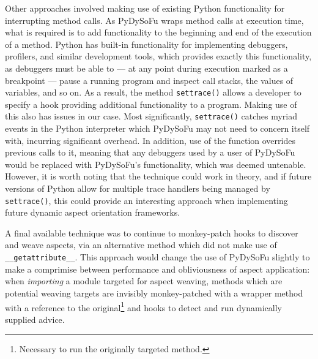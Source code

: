 Other approaches involved making use of existing Python functionality for
interrupting method calls. As PyDySoFu wraps method calls at execution time,
what is required is to add functionality to the beginning and end of the
execution of a method. Python has built-in functionality for implementing
debuggers, profilers, and similar development tools, which provides exactly this
functionality, as debuggers must be able to --- at any point during execution
marked as a breakpoint --- pause a running program and inspect call stacks, the
values of variables, and so on. As a result, the method \lstinline{settrace()}
allows a developer to specify a hook providing additional functionality to a
program. Making use of this also has issues in our case. Most significantly,
\lstinline{settrace()} catches myriad events in the Python interpreter which
PyDySoFu may not need to concern itself with, incurring significant overhead. In
addition, use of the function overrides previous calls to it, meaning that any
debuggers used by a user of PyDySoFu would be replaced with PyDySoFu's
functionality, which was deemed untenable. However, it is worth noting that the
technique could work in theory, and if future versions of Python allow for
multiple trace handlers being managed by \lstinline{settrace()}, this could
provide an interesting approach when implementing future dynamic aspect
orientation frameworks.


A final available technique was to continue to monkey-patch hooks to discover
and weave aspects, via an alternative method which did not make use of
\lstinline{__getattribute__}. This approach would change the use of PyDySoFu
slightly to make a comprimise between performance and obliviousness of aspect
application: when \emph{importing} a module targeted for aspect weaving, methods
which are potential weaving targets are invisibly monkey-patched with a wrapper
method with a reference to the original\footnote{Necessary to run the originally
targeted method.} and hooks to detect and run dynamically supplied advice.


